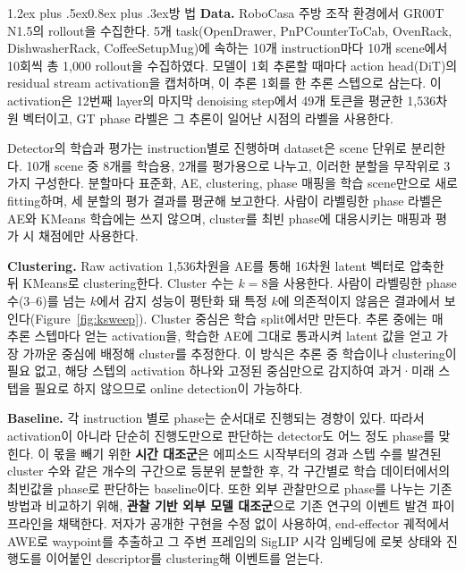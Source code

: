 \documentclass[a4paper,twocolumn,9pt]{extarticle}
\makeatletter
\renewcommand\section{\@startsection{section}{1}{\z@}%
  {1.2ex plus .5ex}{0.8ex plus .3ex}{\normalsize\bfseries}}
\makeatother
\begin{document}
\section{방 법}
\textbf{Data.} RoboCasa 주방 조작 환경에서 GR00T N1.5의 rollout을 수집한다. 5개 task(OpenDrawer, PnPCounterToCab, OvenRack, DishwasherRack, CoffeeSetupMug)에 속하는 10개 instruction마다 10개 scene에서 10회씩 총 1{,}000 rollout을 수집하였다. 모델이 1회 추론할 때마다 action head(DiT)의 residual stream activation을 캡처하며, 이 추론 1회를 한 추론 스텝으로 삼는다. 이 activation은 12번째 layer의 마지막 denoising step에서 49개 토큰을 평균한 1{,}536차원 벡터이고, GT phase 라벨은 그 추론이 일어난 시점의 라벨을 사용한다.

Detector의 학습과 평가는 instruction별로 진행하며 dataset은 scene 단위로 분리한다. 10개 scene 중 8개를 학습용, 2개를 평가용으로 나누고, 이러한 분할을 무작위로 3가지 구성한다. 분할마다 표준화, AE, clustering, phase 매핑을 학습 scene만으로 새로 fitting하며, 세 분할의 평가 결과를 평균해 보고한다. 사람이 라벨링한 phase 라벨은 AE와 KMeans 학습에는 쓰지 않으며, cluster를 최빈 phase에 대응시키는 매핑과 평가 시 채점에만 사용한다.

\textbf{Clustering.} Raw activation 1{,}536차원을 AE를 통해 16차원 latent 벡터로 압축한 뒤 KMeans로 clustering한다. Cluster 수는 $k=8$을 사용한다. 사람이 라벨링한 phase 수(3--6)를 넘는 $k$에서 감지 성능이 평탄화 돼 특정 $k$에 의존적이지 않음은 결과에서 보인다(Figure~\ref{fig:ksweep}). Cluster 중심은 학습 split에서만 만든다. 추론 중에는 매 추론 스텝마다 얻는 activation을, 학습한 AE에 그대로 통과시켜 latent 값을 얻고 가장 가까운 중심에 배정해 cluster를 추정한다. 이 방식은 추론 중 학습이나 clustering이 필요 없고, 해당 스텝의 activation 하나와 고정된 중심만으로 감지하여 과거·미래 스텝을 필요로 하지 않으므로 online detection이 가능하다.

\textbf{Baseline.} 각 instruction 별로 phase는 순서대로 진행되는 경향이 있다. 따라서 activation이 아니라 단순히 진행도만으로 판단하는 detector도 어느 정도 phase를 맞힌다. 이 몫을 빼기 위한 \textbf{시간 대조군}은 에피소드 시작부터의 경과 스텝 수를 발견된 cluster 수와 같은 개수의 구간으로 등분위 분할한 후, 각 구간별로 학습 데이터에서의 최빈값을 phase로 판단하는 baseline이다. 또한 외부 관찰만으로 phase를 나누는 기존 방법과 비교하기 위해, \textbf{관찰 기반 외부 모델 대조군}으로 기존 연구\cite{egsae}의 이벤트 발견 파이프라인을 채택한다. 저자가 공개한 구현을 수정 없이 사용하여, end-effector 궤적에서 AWE\cite{awe}로 waypoint를 추출하고 그 주변 프레임의 SigLIP\cite{siglip} 시각 임베딩에 로봇 상태와 진행도를 이어붙인 descriptor를 clustering해 이벤트를 얻는다.
\end{document}
